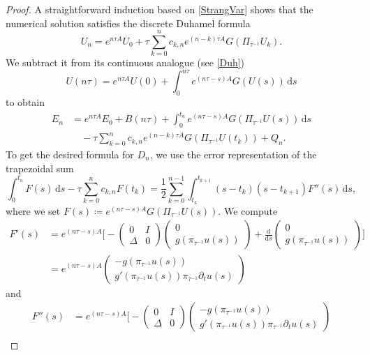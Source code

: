 \documentclass[10pt,a4paper]{amsart}
\newcommand{\dd}{\, \mathrm{d}}
\begin{document}
\begin{proof}
A straightforward induction based on \eqref{StrangVar} shows that the numerical solution satisfies the discrete Duhamel formula
\begin{equation}\label{DiskrDuhamelStrang}
	U_{n} = e^{n\tau A}U_0 + \tau \sum_{k=0}^{n} {c_{k,n}} e^{(n-k)\tau A}G(\Pi_{\tau^{-1}}U_{k}).
\end{equation}
We subtract it from its continuous analogue (see \eqref{Duh})
\begin{equation*}
	U(n\tau) = e^{n\tau A}U(0)+\int_0^{n\tau}e^{(n\tau-s)A}G(U(s)) \dd s
\end{equation*} 
to obtain
\begin{align*}
	E_{n} &= e^{n\tau A}E_0 +  B(n\tau) + \int_0^{t_n}e^{(n\tau-s)A} G(\Pi_{\tau^{-1}}U(s)) \dd s \\ 
	&\quad - \tau \sum_{k=0}^{n} {c_{k,n}} e^{(n-k)\tau A}G(\Pi_{\tau^{-1}}U(t_k)) + Q_n. 
\end{align*}
To get the desired formula for $D_n$, we use the error representation of the trapezoidal sum
\[\int_0^{t_n} F(s) \dd s - \tau\sum_{k=0}^{n}{c_{k,n}}F(t_k) = \frac12\sum_{k=0}^{n-1}\int_{t_k}^{t_{k+1}}(s-t_k)(s-t_{k+1})F''(s) \dd s, \]
where we set $F(s) \coloneqq e^{(n\tau-s)A}G(\Pi_{\tau^{-1}}U(s))$. We compute 
\begin{align*}
	F'(s) &=  e^{(n\tau-s) A}\Bigg[-\begin{pmatrix}0 & I \\ \Delta & 0 \end{pmatrix}\begin{pmatrix}0 \\ g(\pi_{\tau^{-1}} u(s))\end{pmatrix}+\frac{\mathrm{d}}{\mathrm{d}s}\begin{pmatrix}0 \\ g(\pi_{\tau^{-1}} u(s))\end{pmatrix}\Bigg] \\
	&=  e^{(n\tau-s) A}\begin{pmatrix}-g(\pi_{\tau^{-1}} u(s)) \\ g'(\pi_{\tau^{-1}} u(s))\pi_{\tau^{-1}} \partial_t u(s)\end{pmatrix}
\end{align*}
and
\begin{align*}
F''(s) &=  e^{(n\tau-s) A}\Bigg[-\begin{pmatrix}0 & I \\ \Delta & 0 \end{pmatrix}\begin{pmatrix}-g(\pi_{\tau^{-1}} u(s)) \\ g'(\pi_{\tau^{-1}} u(s))\pi_{\tau^{-1}} \partial_t u(s)\end{pmatrix} \\

\end{align*}
\end{proof}
\end{document}
